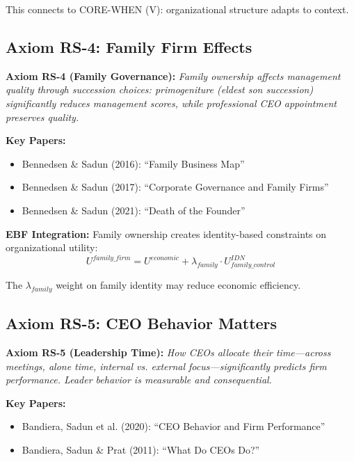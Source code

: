 This connects to CORE-WHEN (V): organizational structure adapts to context.

\subsection{Axiom RS-4: Family Firm Effects}

\begin{tcolorbox}[colback=blue!5!white, colframe=blue!75!black]
\textbf{Axiom RS-4 (Family Governance):}
\textit{Family ownership affects management quality through succession choices:
primogeniture (eldest son succession) significantly reduces management scores,
while professional CEO appointment preserves quality.}
\end{tcolorbox}

\textbf{Key Papers:}
\begin{itemize}[nosep]
    \item Bennedsen \& Sadun (2016): ``Family Business Map''
    \item Bennedsen \& Sadun (2017): ``Corporate Governance and Family Firms''
    \item Bennedsen \& Sadun (2021): ``Death of the Founder''
\end{itemize}

\textbf{EBF Integration:}
Family ownership creates identity-based constraints on organizational utility:
\begin{equation}
U^{family\_firm} = U^{economic} + \lambda_{family} \cdot U^{IDN}_{family\_control}
\end{equation}

The $\lambda_{family}$ weight on family identity may reduce economic efficiency.

\subsection{Axiom RS-5: CEO Behavior Matters}

\begin{tcolorbox}[colback=blue!5!white, colframe=blue!75!black]
\textbf{Axiom RS-5 (Leadership Time):}
\textit{How CEOs allocate their time---across meetings, alone time,
internal vs. external focus---significantly predicts firm performance.
Leader behavior is measurable and consequential.}
\end{tcolorbox}

\textbf{Key Papers:}
\begin{itemize}[nosep]
    \item Bandiera, Sadun et al. (2020): ``CEO Behavior and Firm Performance''
    \item Bandiera, Sadun \& Prat (2011): ``What Do CEOs Do?''
\end{itemize}

